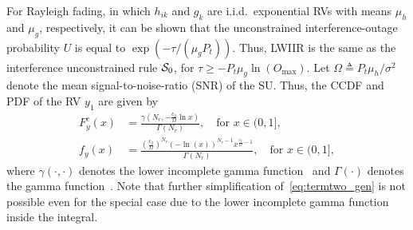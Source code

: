 \documentclass[12pt,draftcls,peerreview,onecolumn]{IEEEtran}
\newcommand{\define}{\triangleq}
\newcommand{\mug}{{\mu_{g}}}
\newcommand{\muh}{{\mu_{h}}}
\newcommand{\Nr}{{N_r}}
\newcommand{\Pt}{{P_t}}
\newcommand{\such}{h}
\newcommand{\puch}{g}
\newcommand{\hk}[1]{{\such_{#1}}}
\newcommand{\gk}[1]{{\puch_{#1}}}
\newcommand{\noisevar}{\sigma^2}
\newcommand{\outmax}{O_{\text{max}}}
\newcommand{\itau}{\tau}
\newcommand{\ctwo}{c_{2}}
\newcommand{\yk}[1]{y_{#1}}
\newcommand{\inlccdfg}[1][]{\exp\left({-{{#1}\itau}/{\left( \mug\Pt\right) }}\right)}
\newcommand{\al}{\ctwo}
\newcommand{\snr}{\Omega}
\newcommand{\albysnr}[1][]{\frac{\al#1}{\snr}}
\newcommand{\un}{U}
\newcommand{\caluncons}{{\cal S_{\text{0}}}}
\newcommand{\ccdfyNr}[1]{\frac{\gamma\left(\Nr,-\albysnr\ln{#1}\right)}{\Gamma\left(\Nr\right)}}
\newcommand{\pdfyNr}{\frac{\left(\albysnr\right)^{\Nr}\left(-\ln\left({x}\right)\right)^{\Nr-1}x^{\albysnr[]-1}}{\Gamma(\Nr)}} %
\newcommand{\pdfyNrgen}[1]{f_{y}\left(#1\right)} %
\newcommand{\ccdfyrv}[1]{ F^{c}_{y}\left(#1 \right) }
\begin{document}
For Rayleigh fading, in which $\hk{ik}$ and $\gk{k}$ are i.i.d.\ exponential RVs with means $\muh$ and $\mug$, respectively, it can be shown that the unconstrained interference-outage probability $\un$ is equal to $\inlccdfg[]$. Thus, LWIIR is the same as the interference unconstrained rule $\caluncons$, for $\itau\geq-\Pt\mug\ln\left(\outmax\right)$.  Let $\snr\define\Pt\muh/\noisevar$ denote the mean signal-to-noise-ratio (SNR) of the SU. Thus, the CCDF and PDF of the RV $\yk{1}$ are given by 
\begin{align}
\label{eq:ccdfyNr}
\ccdfyrv{x} &= \ccdfyNr{x}, \quad \text{for}\,\, x \in (0,1],\\
\label{eq:pdfyNr}
\pdfyNrgen{x} &= \pdfyNr, \quad \text{for}\,\,  x \in (0,1],
\end{align}
where $\gamma(\cdot,\cdot)$ denotes the lower incomplete gamma function~\cite[(8.350.1)]{gradshteyn00_book} and $\Gamma(\cdot)$ denotes the gamma function~\cite[(8.339.1)]{gradshteyn00_book}. Note that further simplification of~\eqref{eq:termtwo_gen} is not possible even for the special case due to the lower incomplete gamma function inside the integral.  
%
\end{document}
